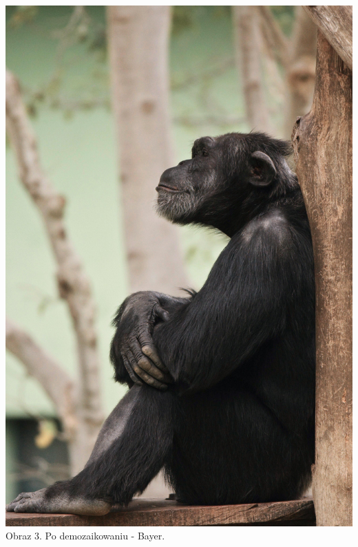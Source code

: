 \documentclass[14pt]{article}
\begin{document}
\begin{center}
    \vspace{0.5cm}
    \includegraphics[scale=0.06]{images/Bayer_Demo.jpg}
    \\ \small Obraz 3. Po demozaikowaniu - Bayer.


\end{center}
\end{document}
